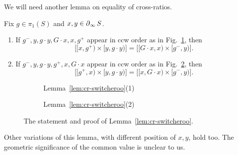 We will need another lemma on equality of cross-ratios.
\begin{lemma}\label{lem:cr-switcheroo}
  Fix $g \in \pi_1(S)$ and $x,y \in \operatorname{\partial}_\infty S$.
  
  \begin{enumerate} 
      \item If $g^-,y,g\cdot y, G \cdot x, x,g^+$
  appear in ccw order as in Fig.~\ref{fig:cr-geo1}, then
  \[
    \bigl[[x,g^+)\times[y,g \cdot y)\bigr]
      = \bigl[[G \cdot x,x)\times[g^-,y)\bigr].
  \]
  \item If $g^-,y,g\cdot y, g^+, x, G \cdot x$
  appear in ccw order as in Fig.~\ref{fig:cr-geo2}, then
  \[
    \bigl[[g^+,x)\times[y,g \cdot y)\bigr]
      = \bigl[[x,G \cdot x)\times[g^-,y)\bigr].
  \]
  \end{enumerate}
\end{lemma}


\begin{figure}
\centering

\begin{subfigure}{0.48\textwidth}
\centering
{}
\caption{Lemma~\ref{lem:cr-switcheroo}(1)}
\label{fig:cr-geo1}
\end{subfigure}
\hfill
\begin{subfigure}{0.48\textwidth}
\centering
{}
\caption{Lemma~\ref{lem:cr-switcheroo}(2)}
\label{fig:cr-geo2}
\end{subfigure}

\caption{The statement and proof of Lemma~\ref{lem:cr-switcheroo}.}
\label{fig:cr-geo}
\end{figure}

Other variations of this lemma, with different position of $x,y$, hold
too. The geometric significance of
the common value is unclear to us.

